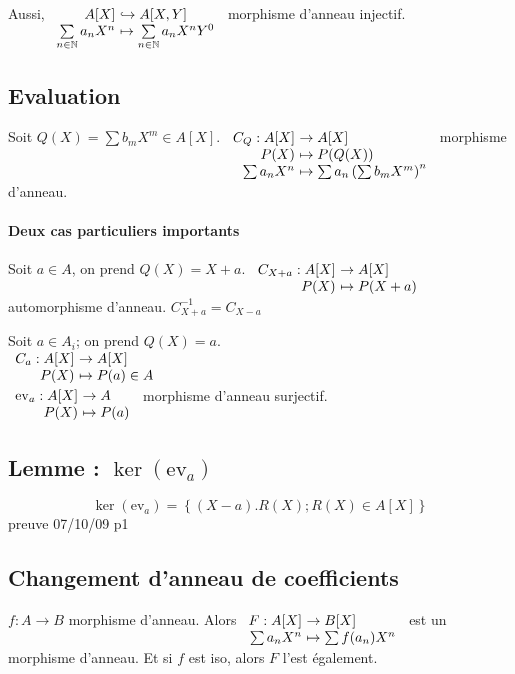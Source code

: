 \documentclass[reqno,a4paper,10pt]{report}
\makeatletter
\newcommand{\set}[1]{\left\lbrace #1 \right\rbrace} %
\newcommand{\IN}{\ensuremath{\mathbb{N}}\xspace} %
\newcommand{\inj}{\hookrightarrow}
\newcommand{\ev}[1]{\mathrm{ev}_{ #1 }}
\let\oldenumerate=\enumerate%
\renewenvironment{enumerate}{%
    \oldenumerate%
  }{%
    \@noparlisttrue%
    \endlist%
  }%
\makeatother
\begin{document}
Aussi, $
\begin{array}[t]{r@{\ }l}
  A[X] &\inj A[X,Y]\\
  \sum\limits_{n\in \IN} a_n X^n &\mapsto  \sum\limits_{n \in \IN} a_n
  X^n Y^0
\end{array}$ morphisme d'anneau injectif.

\subsection{Evaluation}
Soit $Q(X) = \sum b_m X^m \in A[X]$.
$\begin{array}[t]{r@{\ }l}
  C_Q : A[X] &\to A[X]\\
  P(X) &\mapsto P(Q(X))\\
  \sum a_n X^n &\mapsto \sum a_n \left( \sum b_m X^m \right)^n
\end{array}$ morphisme d'anneau.

\paragraph{Deux cas particuliers importants}
\begin{enumerate}
  \item Soit $a\in A$, on prend $Q(X) = X + a$.
    $\begin{array}[t]{r@{\ }l}
      C_{X+a} : A[X] &\to A[X]\\
      P(X) &\mapsto P(X+a)
    \end{array}$ automorphisme d'anneau. $C_{X+a}^{-1}=C_{X-a}$
  \item Soit $a\in A_i$; on prend $Q(X)=a$.\\
    $\begin{array}[t]{r@{\ }l}
      C_a: A[X] &\to A[X]\\
      P(X) &\mapsto P(a) \in A
    \end{array}$\\
    $\begin{array}[t]{r@{\ }l}
       \ev{a}: A[X] &\to A\\
      P(X) &\mapsto P(a)
    \end{array}$ morphisme d'anneau surjectif.
\end{enumerate} 
\subsection{Lemme : $\ker(\ev a)$}
\[\ker(\ev a) = \set{(X-a).R(X); R(X) \in A[X]}\]
preuve 07/10/09 p1

\subsection{Changement d'anneau de coefficients}
$f:A \to B$ morphisme d'anneau. Alors $
\begin{array}[t]{r@{\ }l}
  F: A[X] &\to B[X]\\
  \sum a_n X^n &\mapsto \sum f(a_n) X^n
\end{array}$ est un morphisme d'anneau. Et si $f$ est iso, alors $F$ l'est
également.
\end{document}
